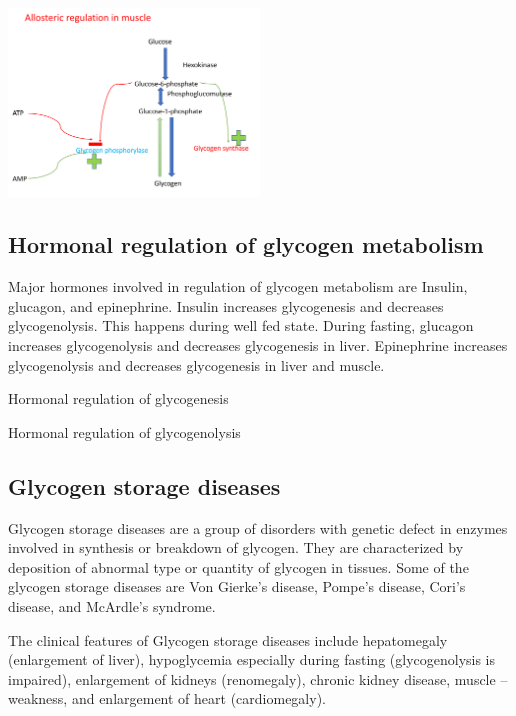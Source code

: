 \documentclass[
]{book}
\begin{document}
\includegraphics[width=0.5\textwidth,height=\textheight]{Images/Gly_allo_muscle.png}

\subsection{Hormonal regulation of glycogen metabolism}\label{hormonal-regulation-of-glycogen-metabolism}

Major hormones involved in regulation of glycogen metabolism are Insulin, glucagon, and epinephrine. Insulin increases glycogenesis and decreases glycogenolysis. This happens during well fed state.
During fasting, glucagon increases glycogenolysis and decreases glycogenesis in liver. Epinephrine increases glycogenolysis and decreases glycogenesis in liver and muscle.

Hormonal regulation of glycogenesis

Hormonal regulation of glycogenolysis

\subsection{Glycogen storage diseases}\label{glycogen-storage-diseases}

Glycogen storage diseases are a group of disorders with genetic defect in enzymes involved in synthesis or breakdown of glycogen. They are characterized by deposition of abnormal type or quantity of glycogen in tissues. Some of the glycogen storage diseases are Von Gierke's disease, Pompe's disease, Cori's disease, and McArdle's syndrome.

The clinical features of Glycogen storage diseases include hepatomegaly (enlargement of liver), hypoglycemia especially during fasting (glycogenolysis is impaired), enlargement of kidneys (renomegaly), chronic kidney disease, muscle -- weakness, and enlargement of heart (cardiomegaly).
\end{document}
